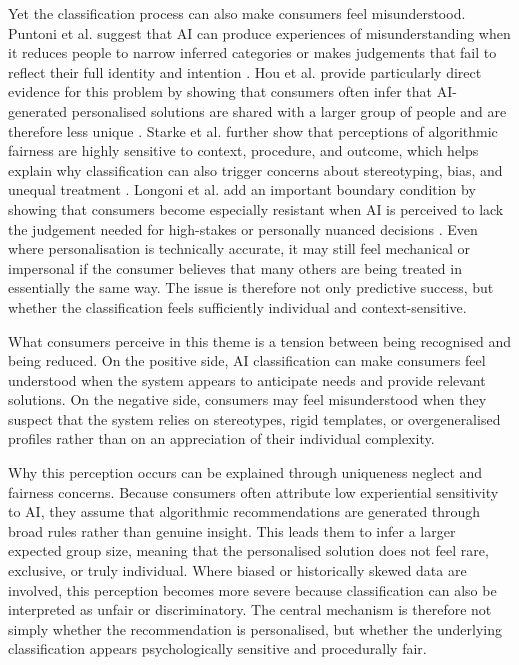 Yet the classification process can also make consumers feel misunderstood. Puntoni et al. suggest that AI can produce experiences of misunderstanding when it reduces people to narrow inferred categories or makes judgements that fail to reflect their full identity and intention \cite{puntoni2021experiential}. Hou et al. provide particularly direct evidence for this problem by showing that consumers often infer that AI-generated personalised solutions are shared with a larger group of people and are therefore less unique \cite{hou2026uniqueness}. Starke et al. further show that perceptions of algorithmic fairness are highly sensitive to context, procedure, and outcome, which helps explain why classification can also trigger concerns about stereotyping, bias, and unequal treatment \cite{starke2022fairness}. Longoni et al. add an important boundary condition by showing that consumers become especially resistant when AI is perceived to lack the judgement needed for high-stakes or personally nuanced decisions \cite{longoni2019medical}. Even where personalisation is technically accurate, it may still feel mechanical or impersonal if the consumer believes that many others are being treated in essentially the same way. The issue is therefore not only predictive success, but whether the classification feels sufficiently individual and context-sensitive.

What consumers perceive in this theme is a tension between being recognised and being reduced. On the positive side, AI classification can make consumers feel understood when the system appears to anticipate needs and provide relevant solutions. On the negative side, consumers may feel misunderstood when they suspect that the system relies on stereotypes, rigid templates, or overgeneralised profiles rather than on an appreciation of their individual complexity.

Why this perception occurs can be explained through uniqueness neglect and fairness concerns. Because consumers often attribute low experiential sensitivity to AI, they assume that algorithmic recommendations are generated through broad rules rather than genuine insight. This leads them to infer a larger expected group size, meaning that the personalised solution does not feel rare, exclusive, or truly individual. Where biased or historically skewed data are involved, this perception becomes more severe because classification can also be interpreted as unfair or discriminatory. The central mechanism is therefore not simply whether the recommendation is personalised, but whether the underlying classification appears psychologically sensitive and procedurally fair.

